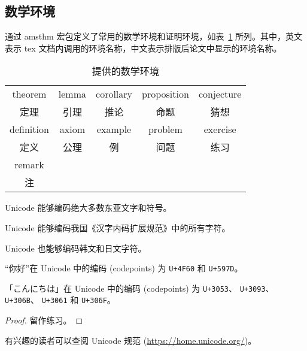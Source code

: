 \documentclass[doctor]{shtthesis}
\begin{document}
\subsection{数学环境}
\shtthesis 通过 \textsf{amsthm} 宏包定义了常用的数学环境和证明环境，如表~\ref{tab::math_envs} 所列。其中，英文表示 tex 文档内调用的环境名称，中文表示排版后论文中显示的环境名称。

\begin{table}[htb]
\centering
\caption{\shtthesis 提供的数学环境}
\label{tab::math_envs}
\begin{tabular}{*{5}{c}}
  \toprule
  theorem & lemma & corollary & proposition & conjecture \\
  定理    & 引理  & 推论       & 命题        & 猜想       \\
  \midrule
  definition & axiom & example & problem & exercise \\
  定义       & 公理  & 例       & 问题    & 练习     \\
  \midrule
  remark & & & & \\
  注 & & & & \\
  \bottomrule
\end{tabular}
\end{table}

\begin{theorem}
  Unicode 能够编码绝大多数东亚文字和符号。
\end{theorem}

\begin{corollary}
  Unicode 能够编码我国《汉字内码扩展规范》中的所有字符。
\end{corollary}

\begin{corollary}
  Unicode 也能够编码韩文和日文字符。
\end{corollary}

\begin{example}
  “你好”在 Unicode 中的编码 (codepoints) 为 \verb|U+4F60| 和 \verb|U+597D|。
\end{example}

\begin{example}
  「こんにちは」在 Unicode 中的编码 (codepoints) 为 \verb|U+3053|、 \verb|U+3093|、 \verb|U+306B|、 \verb|U+3061| 和 \verb|U+306F|。
\end{example}

\begin{proof}
  留作练习。
\end{proof}

\begin{remark}
  有兴趣的读者可以查阅 Unicode 规范 (\url{https://home.unicode.org/})。
\end{remark}
\end{document}
